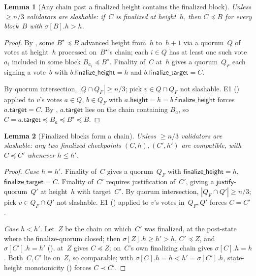 \ifx\litemode\undefined\documentclass{article}\fi
\newcommand{\target}{\mathsf{target}}
\newcommand{\height}{\mathsf{height}}
\newcommand{\just}{\ensuremath{\mathsf{justify}}\xspace}
\newcommand{\finalizeHeight}{\mathsf{finalize\_height}}
\newcommand{\finalizeTarget}{\mathsf{finalize\_target}}
\theoremstyle{plain}
\newtheorem{lemma}{Lemma}
\theoremstyle{definition}
\theoremstyle{remark}
\begin{document}
\begin{lemma}[Any chain past a finalized height contains the finalized block]\label{lem:mainsafety}
Unless $\geq n/3$ validators are slashable: if~$C$ is finalized at height~$h$, then $C \preceq B$ for every block~$B$ with $\sigma[B].h > h$.
\end{lemma}

\begin{proof}
By , some $B^\star \preceq B$ advanced height from~$h$ to~$h+1$ via a quorum~$Q$ of votes at height~$h$ processed on~$B^\star$'s chain; each $i \in Q$ has at least one such vote~$a_i$ included in some block $B_{a_i} \preceq B^\star$.
Finality of~$C$ at~$h$ gives a quorum~$Q_F$ each signing a vote~$b$ with $b.\finalizeHeight = h$ and $b.\finalizeTarget = C$.

By quorum intersection, $|Q \cap Q_F| \geq n/3$; pick $v \in Q \cap Q_F$ not slashable.
E1 () applied to $v$'s votes $a \in Q$, $b \in Q_F$ with $a.\height = h = b.\finalizeHeight$ forces $a.\target = C$.
By , $a.\target$ lies on the chain containing $B_a$, so $C = a.\target \preceq B_a \preceq B^\star \preceq B$.
\end{proof}

\begin{lemma}[Finalized blocks form a chain]\label{lem:finchain}
Unless $\geq n/3$ validators are slashable: any two finalized checkpoints $(C, h), (C', h')$ are compatible, with $C \preceq C'$ whenever $h \leq h'$.
\end{lemma}

\begin{proof}
\emph{Case $h = h'$.}
Finality of~$C$ gives a quorum~$Q_F$ with $\finalizeHeight = h$, $\finalizeTarget = C$.
Finality of~$C'$ requires justification of~$C'$, giving a \just-quorum~$Q'$ at height~$h$ with target~$C'$.
By quorum intersection, $|Q_F \cap Q'| \geq n/3$; pick $v \in Q_F \cap Q'$ not slashable.
E1 () applied to $v$'s votes in~$Q_F, Q'$ forces $C = C'$.

\emph{Case $h < h'$.}
Let~$Z$ be the chain on which~$C'$ was finalized, at the post-state where the finalize-quorum closed; then $\sigma[Z].h \geq h' > h$, $C' \preceq Z$, and $\sigma[C'].h = h'$ ().
 at~$Z$ gives $C \preceq Z$;  on~$C$'s own finalizing chain gives $\sigma[C].h = h$.
Both~$C, C'$ lie on~$Z$, so comparable; with $\sigma[C].h = h < h' = \sigma[C'].h$, state-height monotonicity () forces $C \prec C'$.
\end{proof}
\end{document}
